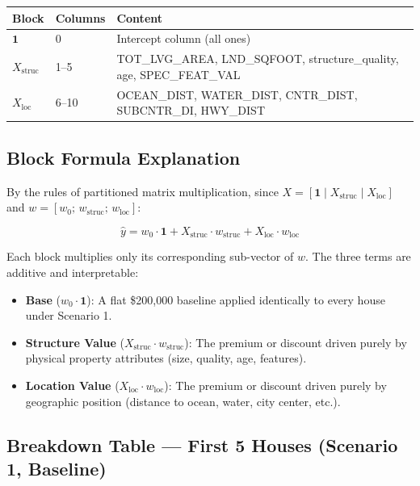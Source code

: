 \documentclass[11pt]{article}
\begin{document}
\begin{center}
\begin{tabular}{l l p{7cm}}
\toprule
Block & Columns & Content \\
\midrule
$\mathbf{1}$      & 0    & Intercept column (all ones) \\
$X_{\text{struc}}$ & 1--5 & TOT\_LVG\_AREA, LND\_SQFOOT, structure\_quality, age, SPEC\_FEAT\_VAL \\
$X_{\text{loc}}$   & 6--10 & OCEAN\_DIST, WATER\_DIST, CNTR\_DIST, SUBCNTR\_DI, HWY\_DIST \\
\bottomrule
\end{tabular}
\end{center}

\subsection*{Block Formula Explanation}

By the rules of partitioned matrix multiplication, since $X = [\mathbf{1} \mid X_{\text{struc}} \mid X_{\text{loc}}]$ and $w = [w_0;\,w_{\text{struc}};\,w_{\text{loc}}]$:

\[
\hat{y} = w_0 \cdot \mathbf{1} + X_{\text{struc}} \cdot w_{\text{struc}} + X_{\text{loc}} \cdot w_{\text{loc}}
\]

Each block multiplies only its corresponding sub-vector of $w$. The three terms are additive and interpretable:
\begin{itemize}
    \item \textbf{Base} ($w_0 \cdot \mathbf{1}$): A flat \$200,000 baseline applied identically to every house under Scenario 1.
    \item \textbf{Structure Value} ($X_{\text{struc}} \cdot w_{\text{struc}}$): The premium or discount driven purely by physical property attributes (size, quality, age, features).
    \item \textbf{Location Value} ($X_{\text{loc}} \cdot w_{\text{loc}}$): The premium or discount driven purely by geographic position (distance to ocean, water, city center, etc.).
\end{itemize}

\subsection*{Breakdown Table --- First 5 Houses (Scenario 1, Baseline)}
\end{document}
